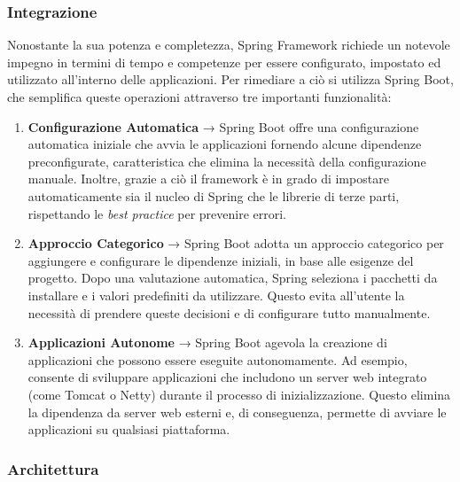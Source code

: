 \subsubsection{Integrazione}

Nonostante la sua potenza e completezza, Spring Framework richiede un notevole impegno in termini di tempo e competenze per essere configurato, impostato ed utilizzato all’interno delle applicazioni. Per rimediare a ciò si utilizza Spring Boot, che semplifica queste operazioni attraverso tre importanti funzionalità:
\begin{enumerate}
    \item \textbf{Configurazione Automatica} → Spring Boot offre una configurazione automatica iniziale che avvia le applicazioni fornendo alcune dipendenze preconfigurate, caratteristica che elimina la necessità della configurazione manuale. Inoltre, grazie a ciò il framework è in grado di impostare automaticamente sia il nucleo di Spring che le librerie di terze parti, rispettando le \textit{best practice} per prevenire errori.\cite{SPRINGBOOT_ibm}
    \item \textbf{Approccio Categorico} → Spring Boot adotta un approccio categorico per aggiungere e configurare le dipendenze iniziali, in base alle esigenze del progetto. Dopo una valutazione automatica, Spring seleziona i pacchetti da installare e i valori predefiniti da utilizzare. Questo evita all'utente la necessità di prendere queste decisioni e di configurare tutto manualmente.\cite{SPRINGBOOT_ibm}
    \item \textbf{Applicazioni Autonome} → Spring Boot agevola la creazione di applicazioni che possono essere eseguite autonomamente. Ad esempio, consente di sviluppare applicazioni che includono un server web integrato (come Tomcat o Netty) durante il processo di inizializzazione. Questo elimina la dipendenza da server web esterni e, di conseguenza, permette di avviare le applicazioni su qualsiasi piattaforma.\cite{SPRINGBOOT_ibm}
\end{enumerate}

\subsubsection{Architettura}

